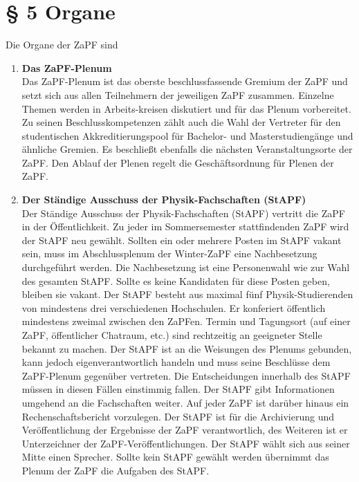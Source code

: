 \section*{§ 5 Organe}
Die Organe der ZaPF sind
\begin{enumerate}
\item{\textbf{Das ZaPF-Plenum}\\
Das ZaPF-Plenum ist das oberste beschlussfassende Gremium der ZaPF und setzt sich aus allen Teilnehmern der jeweiligen ZaPF
zusammen. Einzelne Themen werden in Arbeits-kreisen diskutiert und für das Plenum vorbereitet. Zu seinen Beschlusskompetenzen
zählt auch die Wahl der Vertreter für den studentischen Akkreditierungspool für Bachelor- und Masterstudiengänge und ähnliche
Gremien. Es beschließt ebenfalls die nächsten Veranstaltungsorte der ZaPF.
Den Ablauf der Plenen regelt die Geschäftsordnung für Plenen der ZaPF.}
\item{\textbf{Der Ständige Ausschuss der Physik-Fachschaften (StAPF)}\\
Der Ständige Ausschuss der Physik-Fachschaften (StAPF) vertritt die ZaPF in der Öffentlichkeit. Zu jeder im
Sommersemester stattfindenden ZaPF wird der StAPF neu gewählt. Sollten ein oder mehrere Posten im StAPF vakant sein,
muss im Abschlussplenum der Winter-ZaPF eine Nachbesetzung durchgeführt werden. Die Nachbesetzung ist eine Personenwahl
wie zur Wahl des gesamten StAPF. Sollte es keine Kandidaten für diese Posten geben, bleiben sie vakant. Der StAPF
besteht aus maximal fünf Physik-Studierenden von mindestens drei verschiedenen Hochschulen. Er konferiert öffentlich
mindestens zweimal zwischen den ZaPFen. Termin und Tagungsort (auf einer ZaPF, öffentlicher Chatraum, etc.) sind
rechtzeitig an geeigneter Stelle bekannt zu machen. Der StAPF ist an die Weisungen des Plenums gebunden, kann jedoch
eigenverantwortlich handeln und muss seine Beschlüsse dem ZaPF-Plenum gegenüber vertreten. Die Entscheidungen innerhalb
des StAPF müssen in diesen Fällen einstimmig fallen. Der StAPF gibt Informationen umgehend an die Fachschaften weiter.
Auf jeder ZaPF ist darüber hinaus ein Rechenschaftsbericht vorzulegen. Der StAPF ist für die Archivierung und
Veröffentlichung der Ergebnisse der ZaPF verantwortlich, des Weiteren ist er Unterzeichner der ZaPF-Veröffentlichungen.
Der StAPF wählt sich aus seiner Mitte einen Sprecher. Sollte kein StAPF gewählt werden übernimmt das Plenum der ZaPF
die Aufgaben des StAPF.}
\end{enumerate}

